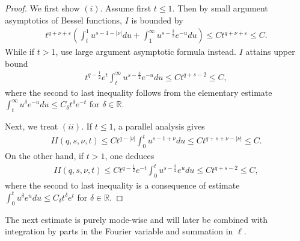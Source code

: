 \documentclass[12pt]{amsart}
\begin{document}
\begin{proof}
We first show $(i)$. Assume first $t\le 1$. Then by small argument asymptotics of Bessel functions, $I$ is bounded by 
\begin{align*}
    t^{q+\nu+\varepsilon} \left( \int_t^1 u^{s-1-|\nu|} du + \int_1^\infty u^{s-\frac{3}{2}} e^{-u} du   \right) \le C t^{q+\nu+\varepsilon} \le C.
\end{align*}
While if $t>1$, use large argument asymptotic formula instead. $I$ attains upper bound
\begin{align*}
    t^{q-\frac{1}{2}} e^t \int_t^\infty u^{s-\frac{3}{2}} e^{-u} du \le C t^{q+s-2}\le C, 
\end{align*}
where the second to last inequality follows from the elementary estimate $\int_t^\infty u^{\delta} e^{-u}du\le C_\delta t^\delta e^{-t}$ for $\delta\in \mathbb{R}$.

Next, we treat $(ii)$. If $t\le 1$, a parallel analysis gives
\begin{align*}
    II(q,s,\nu,t) \le C t^{q-|\nu|} \int_0^t u^{s-1+\nu} du \le C t^{q+s+\nu-|\nu|}\le C. 
\end{align*}
On the other hand, if $t>1$, one deduces 
\begin{align*}
   II(q,s,\nu,t)\le C t^{q-\frac{1}{2}} e^{-t} \int_0^t u^{s-\frac{3}{2}} e^u du \le C t^{q+s-2} \le C,
\end{align*}
where the second to last inequality is a consequence of estimate $\int_0^t u^{\delta} e^{u}du\le C_\delta t^\delta e^{t}$ for $\delta\in \mathbb{R}$.



\end{proof}




The next estimate is purely mode-wise and will later be
combined with integration by parts in the Fourier variable and summation in $\ell$.
\end{document}
